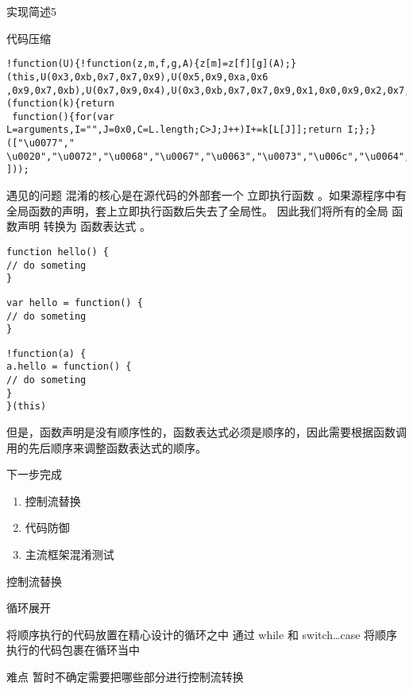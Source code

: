 \documentclass[presentation]{beamer}
\begin{document}
\begin{frame}[fragile,label=sec-10]{实现简述5}
\begin{block}{代码压缩}
\begin{verbatim}
!function(U){!function(z,m,f,g,A){z[m]=z[f][g](A);}(this,U(0x3,0xb,0x7,0x7,0x9),U(0x5,0x9,0xa,0x6
,0x9,0x7,0xb),U(0x7,0x9,0x4),U(0x3,0xb,0x7,0x7,0x9,0x1,0x0,0x9,0x2,0x7,0x8));}(function(k){return
 function(){for(var L=arguments,I="",J=0x0,C=L.length;C>J;J++)I+=k[L[J]];return I;};}(["\u0077","
\u0020","\u0072","\u0068","\u0067","\u0063","\u0073","\u006c","\u0064","\u006f","\u006e","\u0065"
]));
\end{verbatim}
\end{block}
\end{frame}
\begin{frame}[fragile,label=sec-11]{遇见的问题}
混淆的核心是在源代码的外部套一个 \alert{立即执行函数} 。如果源程序中有全局函数的声明，套上立即执行函数后失去了全局性。
因此我们将所有的全局 \alert{函数声明} 转换为 \alert{函数表达式} 。

\begin{verbatim}
function hello() {
// do someting
}
\end{verbatim}

\begin{verbatim}
var hello = function() {
// do someting
}
\end{verbatim}

\begin{verbatim}
!function(a) {
a.hello = function() {
// do someting
}
}(this)

\end{verbatim}

但是，函数声明是没有顺序性的，函数表达式必须是顺序的，因此需要根据函数调用的先后顺序来调整函数表达式的顺序。
\end{frame}
\begin{frame}[label=sec-12]{下一步完成}
\begin{enumerate}
\item 控制流替换
\item 代码防御
\item 主流框架混淆测试
\end{enumerate}
\end{frame}
\begin{frame}[label=sec-13]{控制流替换}
\begin{block}{循环展开}
\end{block}
\begin{block}{将顺序执行的代码放置在精心设计的循环之中}
通过 while 和 switch\ldots{}case 将顺序执行的代码包裹在循环当中
\end{block}
\begin{block}{难点}
暂时不确定需要把哪些部分进行控制流转换
\end{block}
\end{frame}
\end{document}

